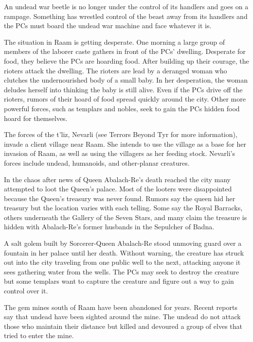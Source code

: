 {
	\item An undead war beetle is no longer under the control of its handlers and goes on a rampage. Something has wrestled control of the beast away from its handlers and the PCs must board the undead war machine and face whatever it is.
	\item The situation in Raam is getting desperate. One morning a large group of members of the laborer caste gathers in front of the PCs' dwelling. Desperate for food, they believe the PCs are hoarding food. After building up their courage, the rioters attack the dwelling. The rioters are lead by a deranged woman who clutches the undernourished body of a small baby. In her desperation, the woman deludes herself into thinking the baby is still alive. Even if the PCs drive off the rioters, rumors of their hoard of food spread quickly around the city. Other more powerful forces, such as templars and nobles, seek to gain the PCs hidden food hoard for themselves.
	\item The forces of the t'liz, Nevarli (see Terrors Beyond Tyr for more information), invade a client village near Raam. She intends to use the village as a base for her invasion of Raam, as well as using the villagers as her feeding stock. Nevarli's forces include undead, humanoids, and other-planar creatures.
	\item In the chaos after news of Queen Abalach-Re's death reached the city many attempted to loot the Queen's palace. Most of the looters were disappointed because the Queen's treasury was never found. Rumors say the queen hid her treasury but the location varies with each telling. Some say the Royal Barracks, others underneath the Gallery of the Seven Stars, and many claim the treasure is hidden with Abalach-Re's former husbands in the Sepulcher of Badna.
	\item A salt golem built by Sorcerer-Queen Abalach-Re stood unmoving guard over a fountain in her palace until her death. Without warning, the creature has struck out into the city traveling from one public well to the next, attacking anyone it sees gathering water from the wells. The PCs may seek to destroy the creature but some templars want to capture the creature and figure out a way to gain control over it.
	\item The gem mines south of Raam have been abandoned for years. Recent reports say that undead have been sighted around the mine. The undead do not attack those who maintain their distance but killed and devoured a group of elves that tried to enter the mine.
}